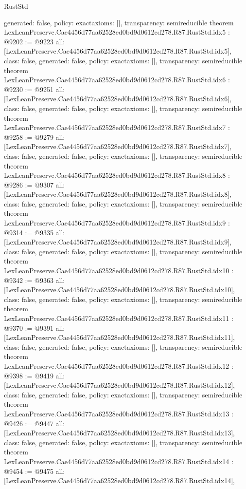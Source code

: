 \begin{lexlean}{RustStd}
\begin{coremodule}
{  generated: false,
  policy: exact{axioms: []},
  transparency: semireducible
}
theorem LexLeanPreserve.Cae4456d77aa62528ed0bd9d0612cd278.R87.RustStd.idx5 : @9202 := @9223 {
  all: [LexLeanPreserve.Cae4456d77aa62528ed0bd9d0612cd278.R87.RustStd.idx5],
  class: false,
  generated: false,
  policy: exact{axioms: []},
  transparency: semireducible
}
theorem LexLeanPreserve.Cae4456d77aa62528ed0bd9d0612cd278.R87.RustStd.idx6 : @9230 := @9251 {
  all: [LexLeanPreserve.Cae4456d77aa62528ed0bd9d0612cd278.R87.RustStd.idx6],
  class: false,
  generated: false,
  policy: exact{axioms: []},
  transparency: semireducible
}
theorem LexLeanPreserve.Cae4456d77aa62528ed0bd9d0612cd278.R87.RustStd.idx7 : @9258 := @9279 {
  all: [LexLeanPreserve.Cae4456d77aa62528ed0bd9d0612cd278.R87.RustStd.idx7],
  class: false,
  generated: false,
  policy: exact{axioms: []},
  transparency: semireducible
}
theorem LexLeanPreserve.Cae4456d77aa62528ed0bd9d0612cd278.R87.RustStd.idx8 : @9286 := @9307 {
  all: [LexLeanPreserve.Cae4456d77aa62528ed0bd9d0612cd278.R87.RustStd.idx8],
  class: false,
  generated: false,
  policy: exact{axioms: []},
  transparency: semireducible
}
theorem LexLeanPreserve.Cae4456d77aa62528ed0bd9d0612cd278.R87.RustStd.idx9 : @9314 := @9335 {
  all: [LexLeanPreserve.Cae4456d77aa62528ed0bd9d0612cd278.R87.RustStd.idx9],
  class: false,
  generated: false,
  policy: exact{axioms: []},
  transparency: semireducible
}
theorem LexLeanPreserve.Cae4456d77aa62528ed0bd9d0612cd278.R87.RustStd.idx10 : @9342 := @9363 {
  all: [LexLeanPreserve.Cae4456d77aa62528ed0bd9d0612cd278.R87.RustStd.idx10],
  class: false,
  generated: false,
  policy: exact{axioms: []},
  transparency: semireducible
}
theorem LexLeanPreserve.Cae4456d77aa62528ed0bd9d0612cd278.R87.RustStd.idx11 : @9370 := @9391 {
  all: [LexLeanPreserve.Cae4456d77aa62528ed0bd9d0612cd278.R87.RustStd.idx11],
  class: false,
  generated: false,
  policy: exact{axioms: []},
  transparency: semireducible
}
theorem LexLeanPreserve.Cae4456d77aa62528ed0bd9d0612cd278.R87.RustStd.idx12 : @9398 := @9419 {
  all: [LexLeanPreserve.Cae4456d77aa62528ed0bd9d0612cd278.R87.RustStd.idx12],
  class: false,
  generated: false,
  policy: exact{axioms: []},
  transparency: semireducible
}
theorem LexLeanPreserve.Cae4456d77aa62528ed0bd9d0612cd278.R87.RustStd.idx13 : @9426 := @9447 {
  all: [LexLeanPreserve.Cae4456d77aa62528ed0bd9d0612cd278.R87.RustStd.idx13],
  class: false,
  generated: false,
  policy: exact{axioms: []},
  transparency: semireducible
}
theorem LexLeanPreserve.Cae4456d77aa62528ed0bd9d0612cd278.R87.RustStd.idx14 : @9454 := @9475 {
  all: [LexLeanPreserve.Cae4456d77aa62528ed0bd9d0612cd278.R87.RustStd.idx14],
}
\end{coremodule}
\end{lexlean}
